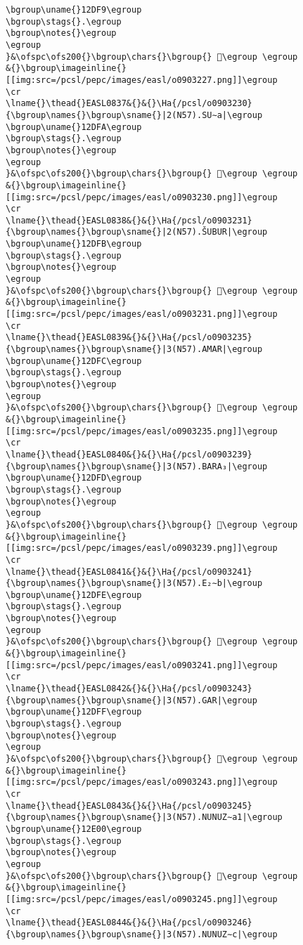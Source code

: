 \begin{verbatim}
\bgroup\uname{}12DF9\egroup
\bgroup\stags{}.\egroup
\bgroup\notes{}\egroup
\egroup
}&\ofspc\ofs200{}\bgroup\chars{}\bgroup{} 𒷹\egroup \egroup
&{}\bgroup\imageinline{}[[img:src=/pcsl/pepc/images/easl/o0903227.png]]\egroup
\cr
\lname{}\thead{}EASL0837&{}&{}\Ha{/pcsl/o0903230}{\bgroup\names{}\bgroup\sname{}|2(N57).SU∼a|\egroup
\bgroup\uname{}12DFA\egroup
\bgroup\stags{}.\egroup
\bgroup\notes{}\egroup
\egroup
}&\ofspc\ofs200{}\bgroup\chars{}\bgroup{} 𒷺\egroup \egroup
&{}\bgroup\imageinline{}[[img:src=/pcsl/pepc/images/easl/o0903230.png]]\egroup
\cr
\lname{}\thead{}EASL0838&{}&{}\Ha{/pcsl/o0903231}{\bgroup\names{}\bgroup\sname{}|2(N57).ŠUBUR|\egroup
\bgroup\uname{}12DFB\egroup
\bgroup\stags{}.\egroup
\bgroup\notes{}\egroup
\egroup
}&\ofspc\ofs200{}\bgroup\chars{}\bgroup{} 𒷻\egroup \egroup
&{}\bgroup\imageinline{}[[img:src=/pcsl/pepc/images/easl/o0903231.png]]\egroup
\cr
\lname{}\thead{}EASL0839&{}&{}\Ha{/pcsl/o0903235}{\bgroup\names{}\bgroup\sname{}|3(N57).AMAR|\egroup
\bgroup\uname{}12DFC\egroup
\bgroup\stags{}.\egroup
\bgroup\notes{}\egroup
\egroup
}&\ofspc\ofs200{}\bgroup\chars{}\bgroup{} 𒷼\egroup \egroup
&{}\bgroup\imageinline{}[[img:src=/pcsl/pepc/images/easl/o0903235.png]]\egroup
\cr
\lname{}\thead{}EASL0840&{}&{}\Ha{/pcsl/o0903239}{\bgroup\names{}\bgroup\sname{}|3(N57).BARA₃|\egroup
\bgroup\uname{}12DFD\egroup
\bgroup\stags{}.\egroup
\bgroup\notes{}\egroup
\egroup
}&\ofspc\ofs200{}\bgroup\chars{}\bgroup{} 𒷽\egroup \egroup
&{}\bgroup\imageinline{}[[img:src=/pcsl/pepc/images/easl/o0903239.png]]\egroup
\cr
\lname{}\thead{}EASL0841&{}&{}\Ha{/pcsl/o0903241}{\bgroup\names{}\bgroup\sname{}|3(N57).E₂∼b|\egroup
\bgroup\uname{}12DFE\egroup
\bgroup\stags{}.\egroup
\bgroup\notes{}\egroup
\egroup
}&\ofspc\ofs200{}\bgroup\chars{}\bgroup{} 𒷾\egroup \egroup
&{}\bgroup\imageinline{}[[img:src=/pcsl/pepc/images/easl/o0903241.png]]\egroup
\cr
\lname{}\thead{}EASL0842&{}&{}\Ha{/pcsl/o0903243}{\bgroup\names{}\bgroup\sname{}|3(N57).GAR|\egroup
\bgroup\uname{}12DFF\egroup
\bgroup\stags{}.\egroup
\bgroup\notes{}\egroup
\egroup
}&\ofspc\ofs200{}\bgroup\chars{}\bgroup{} 𒷿\egroup \egroup
&{}\bgroup\imageinline{}[[img:src=/pcsl/pepc/images/easl/o0903243.png]]\egroup
\cr
\lname{}\thead{}EASL0843&{}&{}\Ha{/pcsl/o0903245}{\bgroup\names{}\bgroup\sname{}|3(N57).NUNUZ∼a1|\egroup
\bgroup\uname{}12E00\egroup
\bgroup\stags{}.\egroup
\bgroup\notes{}\egroup
\egroup
}&\ofspc\ofs200{}\bgroup\chars{}\bgroup{} 𒸀\egroup \egroup
&{}\bgroup\imageinline{}[[img:src=/pcsl/pepc/images/easl/o0903245.png]]\egroup
\cr
\lname{}\thead{}EASL0844&{}&{}\Ha{/pcsl/o0903246}{\bgroup\names{}\bgroup\sname{}|3(N57).NUNUZ∼c|\egroup

\end{verbatim}
